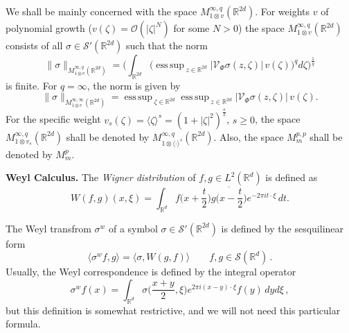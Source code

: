 \documentclass[12pt]{amsart}
\theoremstyle{definition}
\theoremstyle{remark}
\numberwithin{equation}{section}
\newcommand{\stft}{short-time Fourier transform}
\def\cS{\mathcal{S}}
\def\bR{{\mathbb{R}}}
\def\rd{\bR^d}
\def\rdd{{\bR^{2d}}}
\def\lrd{L^2(\rd)}
\def\intrd{\int_{\rd}}
\def\intrdd{\int_{\rdd}}
\def\cS{\mathcal{S}}
\def\cV{\mathcal{V}}
\newcommand{\Cal}{\mathcal}
\newcommand{\lan}{\langle}
\newcommand{\ran}{\rangle}
\newcommand{\phase}{(x,\xi)}
\DeclareMathOperator*{\esup}{ess\,sup\,}
\begin{document}
We shall be mainly concerned with the space
$M^{\infty,q}_{1\otimes v} (\rdd)$. For weights $v$ of polynomial
growth ($v(\zeta)=\Cal O(|\zeta|^N)$ for some $N>0$) the space
$M^{\infty,q}_{1\otimes v} (\rdd)$ consists of all $\sigma\in\Cal
S'(\rdd)$ such that the norm
\begin{equation}
  \label{eq:cc21}
  \|\sigma \|_{M^{\infty,q}_{1\otimes v} (\rdd)}
  =\bigg( \intrdd \Big(\esup _{z\in \rdd } |\cV _\Phi
  \sigma (z,\zeta )| \, v(\zeta) \Big)^q  d\zeta \bigg)^\frac 1q
\end{equation}
is finite. For $q=\infty$, the norm is given by
$$  \|\sigma \|_{M^{\infty,\infty}_{1\otimes v} (\rdd)}
  =\esup_{\zeta\in\rdd}\esup _{z\in \rdd } |\cV _\Phi
  \sigma (z,\zeta )| \, v(\zeta).
$$
For the specific weight
$v_s(\zeta)=\lan\zeta\ran^s=(1+|\zeta|^2)^{\frac s2}$, $s\ge 0$, the
space  $M^{\infty,q}_{1\otimes v_s} (\rdd)$ shall be denoted by
$M^{\infty,q}_{1\otimes \lan\cdot\ran^s} (\rdd)$. Also, the space $M^{p,p}_m$ shall be denoted by $M^{p}_m$.






\textbf{Weyl Calculus.} The \emph{Wigner distribution} of $f,g \in
\lrd $ is defined as
\begin{equation*}
  \label{eq:1a}
    W(f,g)(x,\xi)=\int_{\rd} f\Big(x+\frac{t}2\Big)
    \overline{g\Big(x-\frac{t}2\Big)} e^{-2\pi
    it\cdot\xi }\,dt.
\end{equation*}



 The  Weyl transfrom $\sigma^w $ of a symbol $\sigma\in \Cal S ' (\rdd
 )$ is defined by the sesquilinear form
 \begin{equation}
   \label{eq:f2}
   \langle \sigma ^w f, g \rangle =  \langle \sigma , W(g,f)\rangle
   \qquad f, g \in \cS (\rd ) \, .
 \end{equation}
Usually, the Weyl correspondence is defined by the integral
operator
\begin{equation}
  \label{eq:f2a}
\sigma ^w f(x) = \intrd \sigma \Big(\frac{x+y}{2},\xi \Big)
e^{2\pi i (x-y)\cdot \xi } f(y) \, dy d\xi \, ,
\end{equation}
but this definition is somewhat restrictive, and we will not need
this
particular formula.
\end{document}
